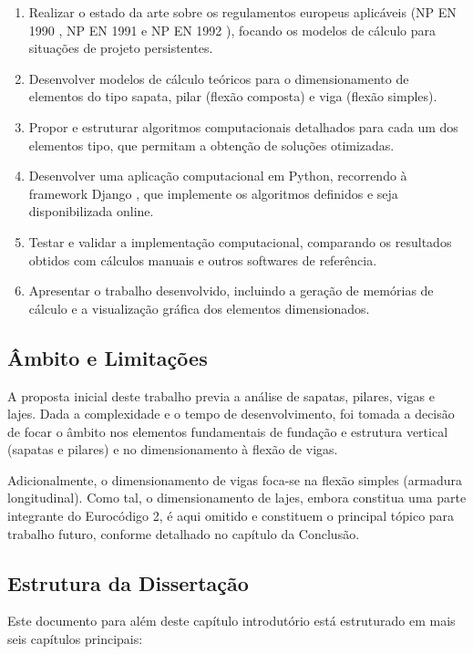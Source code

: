 \begin{enumerate}
    \item Realizar o estado da arte sobre os regulamentos europeus aplicáveis (NP EN 1990 \cite{EN1990}, NP EN 1991 \cite{EN1991} e NP EN 1992 \cite{EN1992}), focando os modelos de cálculo para situações de projeto persistentes.
    \item Desenvolver modelos de cálculo teóricos para o dimensionamento de elementos  do tipo sapata, pilar (flexão composta) e viga (flexão simples).
    \item Propor e estruturar algoritmos computacionais detalhados para cada um dos elementos tipo, que permitam a obtenção de soluções otimizadas.
    \item Desenvolver uma aplicação computacional em Python\cite{PythonDocs}, recorrendo à framework Django \cite{DjangoDocs}, que implemente os algoritmos definidos e seja disponibilizada online.
    \item Testar e validar a implementação computacional, comparando os resultados obtidos com cálculos manuais e outros softwares de referência.
    \item Apresentar o trabalho desenvolvido, incluindo a geração de memórias de cálculo e a visualização gráfica dos elementos dimensionados.
\end{enumerate}

\subsection{Âmbito e Limitações}
A proposta inicial deste trabalho previa a análise de sapatas, pilares, vigas e lajes. Dada a complexidade e o tempo de desenvolvimento, foi tomada a decisão de focar o âmbito nos elementos fundamentais de fundação e estrutura vertical (sapatas e pilares) e no dimensionamento à flexão de vigas.

Adicionalmente, o dimensionamento de vigas foca-se na flexão simples (armadura longitudinal). Como tal, o dimensionamento de lajes, embora constitua uma parte integrante do Eurocódigo 2, é aqui omitido e constituem o principal tópico para trabalho futuro, conforme detalhado no capítulo da Conclusão.

\subsection{Estrutura da Dissertação}
Este documento para além deste capítulo introdutório está estruturado em mais seis capítulos principais:


